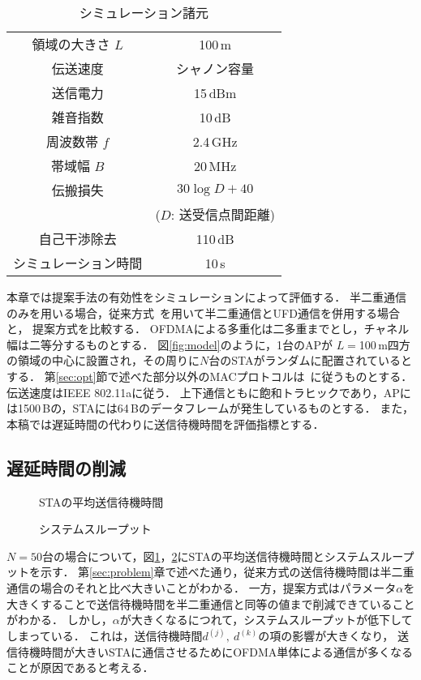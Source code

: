 \documentclass[technicalreport]{ieicej}
\begin{document}
	\begin{table}[t]
		\centering
		\caption{シミュレーション諸元}
		\label{tab:param}
		\begin{tabular}{cc} \hline
			領域の大きさ $L$ & 100\,m \\
			伝送速度 & シャノン容量 \\
			送信電力 & 15\,dBm \\
			雑音指数 & 10\,dB \\
			周波数帯 $f$& 2.4\,GHz \\
			帯域幅 $B$ & 20\,MHz \\
			伝搬損失 & $30\log D + 40$\\
			&($D$: 送受信点間距離)\\
			自己干渉除去 & 110\,dB \\
			シミュレーション時間 & 10\,s \\\hline
		\end{tabular}
	\end{table}

	本章では提案手法の有効性をシミュレーションによって評価する．
	半二重通信のみを用いる場合，従来方式~\cite{promac_fair}を用いて半二重通信とUFD通信を併用する場合と，
	提案方式を比較する．
	OFDMAによる多重化は二多重までとし，チャネル幅は二等分するものとする．
	図\ref{fig:model}のように，1台のAPが $L=$100\,m四方の領域の中心に設置され，その周りに$N$台のSTAがランダムに配置されているとする．
	第\ref{sec:opt}節で述べた部分以外のMACプロトコルは~\cite{promac}に従うものとする．
	伝送速度はIEEE 802.11aに従う．
	上下通信ともに飽和トラヒックであり，APには1500\,Bの，STAには64\,Bのデータフレームが発生しているものとする．
	また，本稿では遅延時間の代わりに送信待機時間を評価指標とする．

	\subsection{遅延時間の削減}
		\begin{figure}[t]
			\centering
			\caption{STAの平均送信待機時間}
			\label{fig:delay}
		\end{figure}
		\begin{figure}[t]
			\centering
			\caption{システムスループット}
			\label{fig:thr}
		\end{figure}

		$N=50$台の場合について，図\ref{fig:delay}，\ref{fig:thr}にSTAの平均送信待機時間とシステムスループットを示す．
		第\ref{sec:problem}章で述べた通り，従来方式の送信待機時間は半二重通信の場合のそれと比べ大きいことがわかる．
		一方，提案方式はパラメータ$\alpha$を大きくすることで送信待機時間を半二重通信と同等の値まで削減できていることがわかる．
		しかし，$\alpha$が大きくなるにつれて，システムスループットが低下してしまっている．
		これは，送信待機時間$d^{(j)},\ d^{(k)}$の項の影響が大きくなり，
		送信待機時間が大きいSTAに通信させるためにOFDMA単体による通信が多くなることが原因であると考える．
\end{document}
